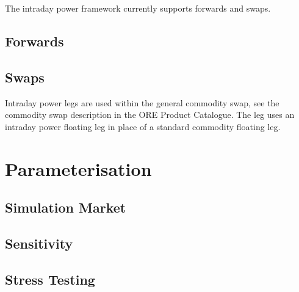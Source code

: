 \documentclass[12pt, a4paper]{article}
\begin{document}
The intraday power framework currently supports forwards and swaps.

\subsection{Forwards}



\subsection{Swaps}

Intraday power legs are used within the general commodity swap, see the commodity swap description in the ORE Product
Catalogue. The leg uses an intraday power floating leg in place of a standard commodity floating leg.



\section{Parameterisation}

\subsection{Simulation Market}



\subsection{Sensitivity}



\subsection{Stress Testing}


\end{document}
